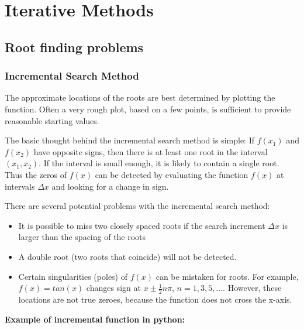 \chapter{Iterative Methods}


\section{Root finding problems}

\subsection{Incremental Search Method}

The approximate locations of the roots are best determined by plotting the function.
Often a very rough plot, based on a few points, is sufficient to provide reasonable
starting values.

The basic thought behind the incremental search method is simple:
If $ f(x_1) $ and $ f(x_2) $ have opposite signs, then there is at least one root
in the interval $ (x_1, x_2) $. If the interval is small enough, it is likely to
contain a single root. Thus the zeros of $ f(x) $ can be detected by evaluating the
function $ f(x) $ at intervals $ \Delta x $ and looking for a change in sign.

There are several potential problems with the incremental search method:

\begin{itemize}
    \item It is possible to miss two closely spaced roots if the search increment
        $ \Delta x $ is larger than the spacing of the roots

    \item A double root (two roots that coincide) will not be detected.

    \item Certain singularities (poles) of $ f(x) $ can be mistaken for roots.
        For example, $ f(x) = tan(x) $ changes sign at $ x \pm \frac{1}{2} n \pi $,
        $ n = 1, 3, 5, \dots $. However, these locations are not true zeroes, because the
        function does not cross the x-axis.

\end{itemize}


\textbf{Example of incremental function in python:}

